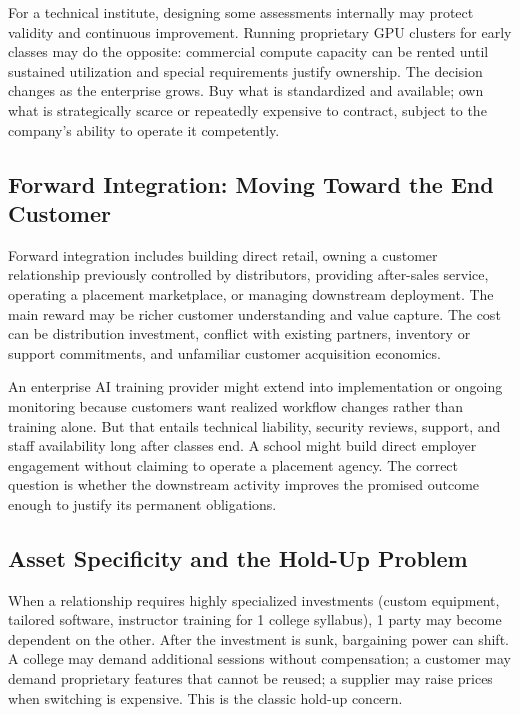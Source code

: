 For a technical institute, designing some assessments internally may protect validity and continuous improvement. Running proprietary GPU clusters for early classes may do the opposite: commercial compute capacity can be rented until sustained utilization and special requirements justify ownership. The decision changes as the enterprise grows. Buy what is standardized and available; own what is strategically scarce or repeatedly expensive to contract, subject to the company's ability to operate it competently.

\subsection{Forward Integration: Moving Toward the End Customer}
\label{sec:forward_integration_downstream_customer}

Forward integration includes building direct retail, owning a customer relationship previously controlled by distributors, providing after-sales service, operating a placement marketplace, or managing downstream deployment. The main reward may be richer customer understanding and value capture. The cost can be distribution investment, conflict with existing partners, inventory or support commitments, and unfamiliar customer acquisition economics.

An enterprise AI training provider might extend into implementation or ongoing monitoring because customers want realized workflow changes rather than training alone. But that entails technical liability, security reviews, support, and staff availability long after classes end. A school might build direct employer engagement without claiming to operate a placement agency. The correct question is whether the downstream activity improves the promised outcome enough to justify its permanent obligations.

\subsection{Asset Specificity and the Hold-Up Problem}
\label{sec:asset_specificity_holdup_problem}

When a relationship requires highly specialized investments (custom equipment, tailored software, instructor training for 1 college syllabus), 1 party may become dependent on the other. After the investment is sunk, bargaining power can shift. A college may demand additional sessions without compensation; a customer may demand proprietary features that cannot be reused; a supplier may raise prices when switching is expensive. This is the classic hold-up concern.

